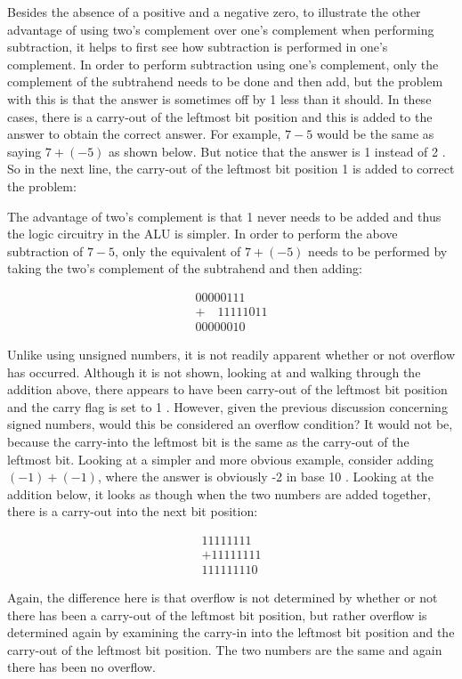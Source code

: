 \documentclass[10pt]{article}
\begin{document}
Besides the absence of a positive and a negative zero, to illustrate the other advantage of using two's complement over one's complement when performing subtraction, it helps to first see how subtraction is performed in one's complement. In order to perform subtraction using one's complement, only the complement of the subtrahend needs to be done and then add, but the problem with this is that the answer is sometimes off by 1 less than it should. In these cases, there is a carry-out of the leftmost bit position and this is added to the answer to obtain the correct answer. For example, $7-5$ would be the same as saying $7+(-5)$ as shown below. But notice that the answer is 1 instead of 2 . So in the next line, the carry-out of the leftmost bit position 1 is added to correct the problem:

The advantage of two's complement is that 1 never needs to be added and thus the logic circuitry in the ALU is simpler. In order to perform the above subtraction of $7-5$, only the equivalent of $7+(-5)$ needs to be performed by taking the two's complement of the subtrahend and then adding:

$$
\begin{array}{r}
00000111 \\
+\quad 11111011 \\
\hline 00000010
\end{array}
$$

Unlike using unsigned numbers, it is not readily apparent whether or not overflow has occurred. Although it is not shown, looking at and walking through the addition above, there appears to have been carry-out of the leftmost bit position and the carry flag is set to 1 . However, given the previous discussion concerning signed numbers, would this be considered an overflow condition? It would not be, because the carry-into the leftmost bit is the same as the carry-out of the leftmost bit. Looking at a simpler and more obvious example, consider adding $(-1)+(-1)$, where the answer is obviously -2 in base 10 . Looking at the addition below, it looks as though when the two numbers are added together, there is a carry-out into the next bit position:

$$
\begin{array}{r}
11111111 \\
+11111111 \\
\hline 111111110
\end{array}
$$

Again, the difference here is that overflow is not determined by whether or not there has been a carry-out of the leftmost bit position, but rather overflow is determined again by examining the carry-in into the leftmost bit position and the carry-out of the leftmost bit position. The two numbers are the same and again there has been no overflow.
\end{document}
